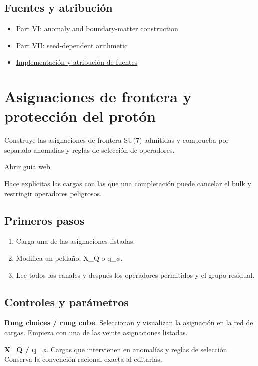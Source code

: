 \documentclass[11pt,a4paper]{article}
\begin{document}
\subsection*{Fuentes y atribución}
\begin{itemize}
\item \href{https://karlesmarin.github.io/ghu-explorer/papers/part-vi/index.html}{Part VI: anomaly and boundary-matter construction}
\item \href{https://karlesmarin.github.io/ghu-explorer/papers/part-vii/index.html}{Part VII: seed-dependent arithmetic}
\item \href{https://github.com/karlesmarin/ghu-lab/blob/main/src/sections/anomalies_section.js}{Implementación y atribución de fuentes}
\end{itemize}
\section{Asignaciones de frontera y protección del protón}
Construye las asignaciones de frontera SU(7) admitidas y comprueba por separado anomalías y reglas de selección de operadores.

\href{https://karlesmarin.github.io/ghu-explorer/guide/es/escape/index.html}{Abrir guía web}

Hace explícitas las cargas con las que una completación puede cancelar el bulk y restringir operadores peligrosos.
\subsection*{Primeros pasos}
\begin{enumerate}
\item Carga una de las asignaciones listadas.
\item Modifica un peldaño, X\_Q o q\_\ensuremath{\phi}.
\item Lee todos los canales y después los operadores permitidos y el grupo residual.
\end{enumerate}
\subsection*{Controles y parámetros}
\textbf{Rung choices / rung cube}. Seleccionan y visualizan la asignación en la red de cargas. Empieza con una de las veinte asignaciones listadas.

\textbf{X\_Q / q\_\ensuremath{\phi}}. Cargas que intervienen en anomalías y reglas de selección. Conserva la convención racional exacta al editarlas.
\end{document}
